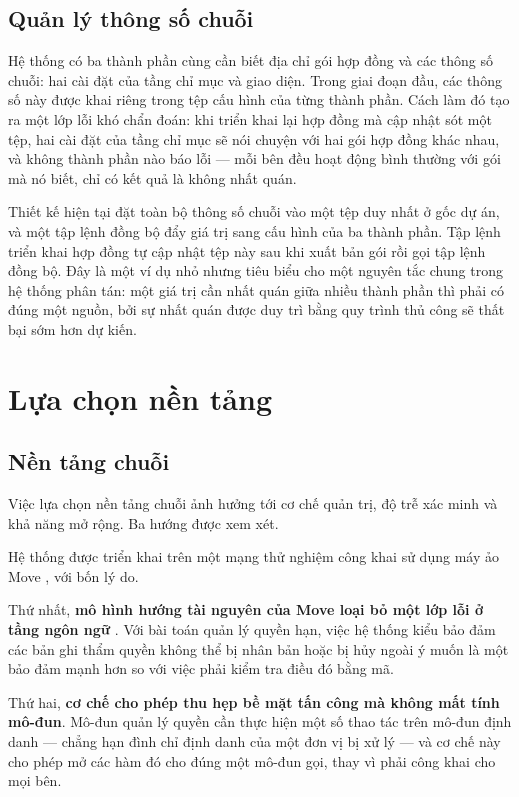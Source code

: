\subsection{Quản lý thông số chuỗi}

Hệ thống có ba thành phần cùng cần biết địa chỉ gói hợp đồng và các thông số chuỗi: hai cài đặt của tầng chỉ mục và giao diện. Trong giai đoạn đầu, các thông số này được khai riêng trong tệp cấu hình của từng thành phần. Cách làm đó tạo ra một lớp lỗi khó chẩn đoán: khi triển khai lại hợp đồng mà cập nhật sót một tệp, hai cài đặt của tầng chỉ mục sẽ nói chuyện với hai gói hợp đồng khác nhau, và không thành phần nào báo lỗi --- mỗi bên đều hoạt động bình thường với gói mà nó biết, chỉ có kết quả là không nhất quán.

Thiết kế hiện tại đặt toàn bộ thông số chuỗi vào một tệp duy nhất ở gốc dự án, và một tập lệnh đồng bộ đẩy giá trị sang cấu hình của ba thành phần. Tập lệnh triển khai hợp đồng tự cập nhật tệp này sau khi xuất bản gói rồi gọi tập lệnh đồng bộ. Đây là một ví dụ nhỏ nhưng tiêu biểu cho một nguyên tắc chung trong hệ thống phân tán: một giá trị cần nhất quán giữa nhiều thành phần thì phải có đúng một nguồn, bởi sự nhất quán được duy trì bằng quy trình thủ công sẽ thất bại sớm hơn dự kiến.

\section{Lựa chọn nền tảng}

\subsection{Nền tảng chuỗi}

Việc lựa chọn nền tảng chuỗi ảnh hưởng tới cơ chế quản trị, độ trễ xác minh và khả năng mở rộng. Ba hướng được xem xét.



Hệ thống được triển khai trên một mạng thử nghiệm công khai sử dụng máy ảo Move \cite{Movement2024}, với bốn lý do.

Thứ nhất, \textbf{mô hình hướng tài nguyên của Move loại bỏ một lớp lỗi ở tầng ngôn ngữ} \cite{Blackshear2019Move}. Với bài toán quản lý quyền hạn, việc hệ thống kiểu bảo đảm các bản ghi thẩm quyền không thể bị nhân bản hoặc bị hủy ngoài ý muốn là một bảo đảm mạnh hơn so với việc phải kiểm tra điều đó bằng mã.

Thứ hai, \textbf{cơ chế  cho phép thu hẹp bề mặt tấn công mà không mất tính mô-đun}. Mô-đun quản lý quyền cần thực hiện một số thao tác trên mô-đun định danh --- chẳng hạn đình chỉ định danh của một đơn vị bị xử lý --- và cơ chế này cho phép mở các hàm đó cho đúng một mô-đun gọi, thay vì phải công khai cho mọi bên.

